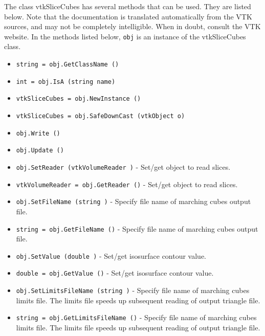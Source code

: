 The class vtkSliceCubes has several methods that can be used.
  They are listed below.
Note that the documentation is translated automatically from the VTK sources,
and may not be completely intelligible.  When in doubt, consult the VTK website.
In the methods listed below, \verb|obj| is an instance of the vtkSliceCubes class.
\begin{itemize}
\item  \verb|string = obj.GetClassName ()|

\item  \verb|int = obj.IsA (string name)|

\item  \verb|vtkSliceCubes = obj.NewInstance ()|

\item  \verb|vtkSliceCubes = obj.SafeDownCast (vtkObject o)|

\item  \verb|obj.Write ()|

\item  \verb|obj.Update ()|

\item  \verb|obj.SetReader (vtkVolumeReader )| -  Set/get object to read slices.

\item  \verb|vtkVolumeReader = obj.GetReader ()| -  Set/get object to read slices.

\item  \verb|obj.SetFileName (string )| -  Specify file name of marching cubes output file.

\item  \verb|string = obj.GetFileName ()| -  Specify file name of marching cubes output file.

\item  \verb|obj.SetValue (double )| -  Set/get isosurface contour value.

\item  \verb|double = obj.GetValue ()| -  Set/get isosurface contour value.

\item  \verb|obj.SetLimitsFileName (string )| -  Specify file name of marching cubes limits file. The limits file
 speeds up subsequent reading of output triangle file.

\item  \verb|string = obj.GetLimitsFileName ()| -  Specify file name of marching cubes limits file. The limits file
 speeds up subsequent reading of output triangle file.

\end{itemize}
